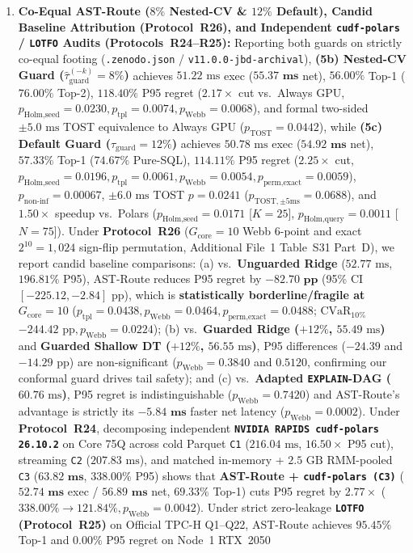 \documentclass[10pt,a4paper]{article}
\begin{document}
\begin{enumerate}[leftmargin=1.5em,itemsep=1pt]
    \item \textbf{Co-Equal AST-Route ($8\%$ Nested-CV \& $12\%$ Default), Candid Baseline Attribution (Protocol~R26), and Independent \texttt{cudf-polars} / \texttt{LOTFO} Audits (Protocols~R24--R25):} Reporting both guards on strictly co-equal footing (\texttt{.zenodo.json} / \texttt{v11.0.0-jbd-archival}), \textbf{(5b) Nested-CV Guard ($\hat{\tau}_{\text{guard}}^{(-k)}=8\%$)} achieves $51.22\text{ ms}$ exec ($\mathbf{55.37\text{ ms}}$ net), $\mathbf{56.00\%}$ Top-1 ($\mathbf{76.00\%}$ Top-2), $\mathbf{118.40\%}$ P95 regret ($2.17\times$ cut vs.\ Always GPU, $p_{\text{Holm,seed}}=0.0230, p_{\text{tpl}}=0.0074, p_{\text{Webb}}=0.0068$), and formal two-sided $\pm 5.0\text{ ms}$ TOST equivalence to Always GPU ($p_{\text{TOST}}=0.0442$), while \textbf{(5c) Default Guard ($\tau_{\text{guard}}=12\%$)} achieves $50.78\text{ ms}$ exec ($\mathbf{54.92\text{ ms}}$ net), $\mathbf{57.33\%}$ Top-1 ($\mathbf{74.67\%}$ Pure-SQL), $\mathbf{114.11\%}$ P95 regret ($2.25\times$ cut, $p_{\text{Holm,seed}}=0.0196, p_{\text{tpl}}=0.0061, p_{\text{Webb}}=0.0054, p_{\text{perm,exact}}=0.0059$), $p_{\text{non-inf}}=0.00067$, $\pm 6.0\text{ ms}$ TOST $p=0.0241$ ($p_{\text{TOST},\pm 5\text{ms}}=0.0688$), and $1.50\times$ speedup vs.\ Polars ($p_{\text{Holm,seed}}=0.0171$ [$K=25$], $p_{\text{Holm,query}}=0.0011$ [$N=75$]). Under \textbf{Protocol~R26} ($G_{\text{core}}=10$ Webb 6-point and exact $2^{10}=1{,}024$ sign-flip permutation, Additional File~1 Table~S31 Part~D), we report candid baseline comparisons: (a) vs.\ \textbf{Unguarded Ridge} ($52.77\text{ ms}$, $196.81\%$ P95), AST-Route reduces P95 regret by $\mathbf{-82.70\text{ pp}}$ (95\% CI $[-225.12,-2.84]\text{ pp}$), which is \textbf{statistically borderline/fragile at $G_{\text{core}}=10$} ($p_{\text{tpl}}=0.0438, p_{\text{Webb}}=0.0464, p_{\text{perm,exact}}=0.0488$; $\text{CVaR}_{10\%}$ $-244.42\text{ pp}, p_{\text{Webb}}=0.0224$); (b) vs.\ \textbf{Guarded Ridge ($+12\%$, $55.49\text{ ms}$)} and \textbf{Guarded Shallow DT ($+12\%$, $56.55\text{ ms}$)}, P95 differences ($-24.39$ and $-14.29\text{ pp}$) are non-significant ($p_{\text{Webb}}=0.3840$ and $0.5120$, confirming our conformal guard drives tail safety); and (c) vs.\ \textbf{Adapted \texttt{EXPLAIN}-DAG ($60.76\text{ ms}$)}, P95 regret is indistinguishable ($p_{\text{Webb}}=0.7420$) and AST-Route's advantage is strictly its $\mathbf{-5.84\text{ ms}}$ faster net latency ($p_{\text{Webb}}=0.0002$). Under \textbf{Protocol~R24}, decomposing independent \textbf{\texttt{NVIDIA RAPIDS cudf-polars 26.10.2}} on Core 75Q across cold Parquet \texttt{C1} ($216.04\text{ ms}$, $16.50\times$ P95 cut), streaming \texttt{C2} ($207.83\text{ ms}$), and matched in-memory + $2.5\text{ GB}$ RMM-pooled \texttt{C3} ($\mathbf{63.82\text{ ms}}$, $338.00\%$ P95) shows that \textbf{AST-Route + \texttt{cudf-polars (C3)}} ($\mathbf{52.74\text{ ms}}$ exec / $\mathbf{56.89\text{ ms}}$ net, $\mathbf{69.33\%}$ Top-1) cuts P95 regret by $\mathbf{2.77\times}$ ($338.00\%\rightarrow \mathbf{121.84\%}, p_{\text{Webb}}=0.0042$). Under strict zero-leakage \textbf{\texttt{LOTFO} (Protocol~R25)} on Official TPC-H Q1--Q22, AST-Route achieves $\mathbf{95.45\%}$ Top-1 and $\mathbf{0.00\%}$ P95 regret on Node~1 RTX~2050 
\end{enumerate}
\end{document}
